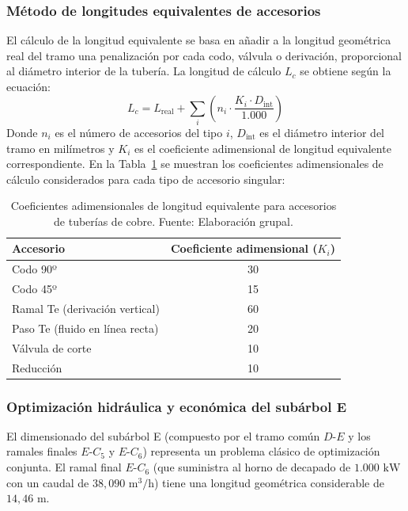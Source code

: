 \documentclass[12pt]{article}
\begin{document}
        \subsubsection{Método de longitudes equivalentes de accesorios}
        El cálculo de la longitud equivalente se basa en añadir a la longitud geométrica real del tramo una penalización por cada codo, válvula o derivación, proporcional al diámetro interior de la tubería. La longitud de cálculo $L_c$ se obtiene según la ecuación:
        \begin{equation}
            L_c = L_{\text{real}} + \sum_{i} \left( n_i \cdot \frac{K_i \cdot D_{\text{int}}}{1.000} \right)
        \end{equation}
        Donde $n_i$ es el número de accesorios del tipo $i$, $D_{\text{int}}$ es el diámetro interior del tramo en milímetros y $K_i$ es el coeficiente adimensional de longitud equivalente correspondiente. En la Tabla~\ref{tab:coeficientes_accesorios} se muestran los coeficientes adimensionales de cálculo considerados para cada tipo de accesorio singular:

        \begin{table}[H]
            \centering
            \caption{Coeficientes adimensionales de longitud equivalente para accesorios de tuberías de cobre. Fuente: Elaboración grupal.}
            \label{tab:coeficientes_accesorios}
            \begin{tabular}{lc}
                \toprule
                \textbf{Accesorio} & \textbf{Coeficiente adimensional ($K_i$)} \\
                \midrule
                Codo 90º & 30 \\
                Codo 45º & 15 \\
                Ramal Te (derivación vertical) & 60 \\
                Paso Te (fluido en línea recta) & 20 \\
                Válvula de corte & 10 \\
                Reducción & 10 \\
                \bottomrule
            \end{tabular}
        \end{table}

        \subsubsection{Optimización hidráulica y económica del subárbol E}
        El dimensionado del subárbol E (compuesto por el tramo común $D$-$E$ y los ramales finales $E$-$C_5$ y $E$-$C_6$) representa un problema clásico de optimización conjunta. El ramal final $E$-$C_6$ (que suministra al horno de decapado de $1.000\text{ kW}$ con un caudal de $38,090\text{ m}^3\text{/h}$) tiene una longitud geométrica considerable de $14,46\text{ m}$.
        
\end{document}
